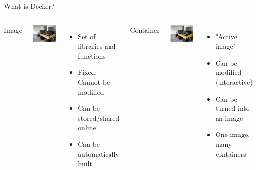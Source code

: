 \begin{frame}{What is Docker?}

\begin{columns}


\centering Image

\centering\includegraphics[width=4cm]{02_encapsulation/images/docker_images_illus.png}

\begin{itemize}
  \item Set of libraries and functions
  \item Fixed. Cannot be modified
  \item Can be stored/shared online
  \item Can be automatically built
\end{itemize}


\centering Container

\centering\includegraphics[width=4cm]{02_encapsulation/images/docker_containers_illus.png} 

\begin{itemize}
  \item "Active image"
  \item Can be modified (interactive)
  \item Can be turned into an image
  \item One image, many containers
\end{itemize}

\end{columns}

\end{frame}

